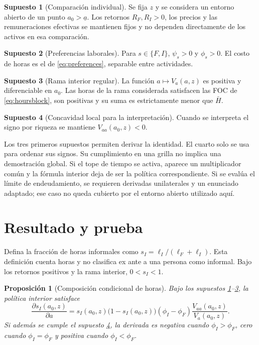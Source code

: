 \documentclass[11pt]{article}
\newtheorem{proposition}{Proposición}
\theoremstyle{definition}
\newtheorem{assumption}{Supuesto}
\newcommand{\Va}{V_a}
\newcommand{\Vaa}{V_{aa}}
\newcommand{\sI}{s_I}
\begin{document}
\begin{assumption}[Comparación individual]\label{ass:fixed}
Se fija \(z\) y se considera un entorno abierto de un punto \(a_0>\underline a\). Los retornos \(R_F,R_I>0\), los precios y las remuneraciones efectivas se mantienen fijos y no dependen directamente de los activos en esa comparación.
\end{assumption}
\begin{assumption}[Preferencias laborales]\label{ass:parameters}
Para \(s\in\{F,I\}\), \(\psi_s>0\) y \(\phi_s>0\). El costo de horas es el de \eqref{eq:preferences}, separable entre actividades.
\end{assumption}
\begin{assumption}[Rama interior regular]\label{ass:regular}
La función \(a\mapsto\Va(a,z)\) es positiva y diferenciable en \(a_0\). Las horas de la rama considerada satisfacen las FOC de \eqref{eq:hoursblock}, son positivas y su suma es estrictamente menor que \(\bar H\).
\end{assumption}
\begin{assumption}[Concavidad local para la interpretación]\label{ass:concavity}
Cuando se interpreta el signo por riqueza se mantiene \(\Vaa(a_0,z)<0\).
\end{assumption}

Los tres primeros supuestos permiten derivar la identidad. El cuarto solo se usa para ordenar sus signos. Su cumplimiento en una grilla no implica una demostración global. Si el tope de tiempo se activa, aparece un multiplicador común y la fórmula interior deja de ser la política correspondiente. Si se evalúa el límite de endeudamiento, se requieren derivadas unilaterales y un enunciado adaptado; ese caso no queda cubierto por el entorno abierto utilizado aquí.

\section{Resultado y prueba}
Defina la fracción de horas informales como
\(\sI=\ell_I/(\ell_F+\ell_I)\). Esta definición cuenta horas y no clasifica ex ante a una persona como informal. Bajo los retornos positivos y la rama interior, \(0<\sI<1\).

\begin{proposition}[Composición condicional de horas]\label{prop:composition}
Bajo los supuestos \ref{ass:fixed}--\ref{ass:regular}, la política interior satisface
\begin{equation}\label{eq:main}
\frac{\partial\sI(a_0,z)}{\partial a}
=\sI(a_0,z)\bigl(1-\sI(a_0,z)\bigr)
(\phi_I-\phi_F)\frac{\Vaa(a_0,z)}{\Va(a_0,z)} .
\end{equation}
Si además se cumple el supuesto \ref{ass:concavity}, la derivada es negativa cuando \(\phi_I>\phi_F\), cero cuando \(\phi_I=\phi_F\) y positiva cuando \(\phi_I<\phi_F\).
\end{proposition}
\end{document}
